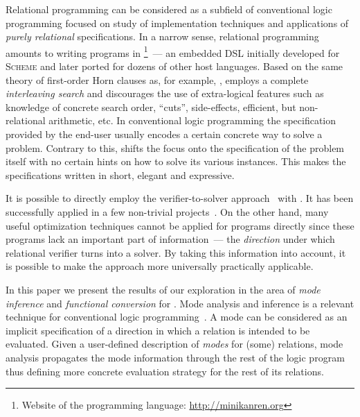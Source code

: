 Relational programming can be considered as a subfield of conventional logic programming focused on study of implementation techniques and applications of \emph{purely relational} specifications.
In a narrow sense, relational programming amounts to writing programs in \mk\footnote{Website of the \mk programming language: \url{http://minikanren.org}}~--- an embedded DSL initially developed for \textsc{Scheme} and later ported for dozens of other host languages.
Based on the same theory of first-order Horn clauses as, for example, \prolog, \mk employs a complete \emph{interleaving search}\cite{kiselyov2005backtracking, rozplokhas2020certified} and discourages the use of extra-logical features such as knowledge of concrete search order, ``cuts'', side-effects, efficient, but non-relational arithmetic, etc.
In conventional logic programming the specification provided by the end-user usually encodes a certain concrete way to solve a problem.
Contrary to this, \mk shifts the focus onto the specification of the problem itself with no certain hints on how to solve its various instances.
This makes the specifications written in \mk short, elegant and expressive.

It is possible to directly employ the verifier-to-solver approach~\cite{type-inferencer,kosarev2020relational} with \mk.
It has been successfully applied in a few non-trivial projects~\cite{kosarev2022declarative,lozov2023relational}.
On the other hand, many useful optimization techniques cannot be applied for \mk programs directly since these programs lack an important part of information~--- the \emph{direction} under which relational verifier turns into a solver.
By taking this information into account, it is possible to make the approach more universally practically applicable.

In this paper we present the results of our exploration in the area of \emph{mode inference} and \emph{functional conversion} for \mk.
Mode analysis and inference is a relevant technique for conventional logic programming~\cite{debray1988automatic,somogyi1987system,overton2002constraint}.
A mode can be considered as an implicit specification of a direction in which a relation is intended to be evaluated.
Given a user-defined description of \emph{modes} for (some) relations, mode analysis propagates the mode information through the rest of the logic program thus defining more concrete evaluation strategy for the rest of its relations.

